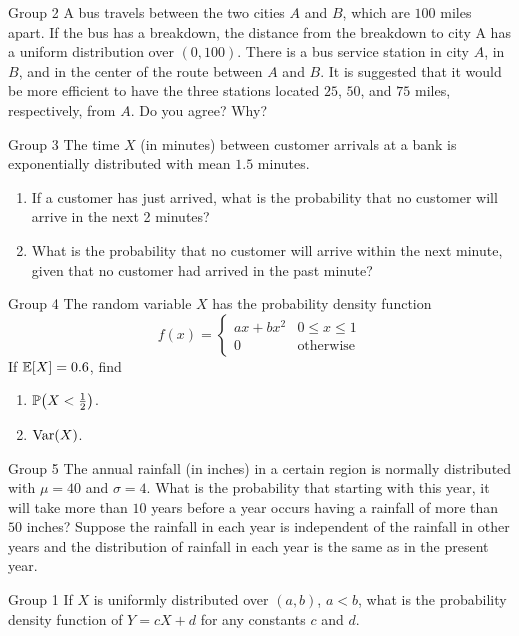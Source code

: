 \documentclass{article}
\begin{document}
\begin{problem}
    {Group 2}
    A bus travels between the two cities $A$ and $B$, which are $100$ miles apart. If the bus has a breakdown, the distance from the breakdown to city A has a uniform distribution over $(0, 100)$. There is a bus service station in city $A$, in $B$, and in the center of the route between $A$ and $B$. It is suggested that it would be more efficient to have the three stations located $25$, $50$, and $75$ miles, respectively, from $A$. Do you agree? Why?
\end{problem}

\begin{problem}
    {Group 3}
    The time $X$ (in minutes) between customer arrivals at a bank is exponentially distributed with mean $1.5$ minutes.
    \begin{enumerate}
        \item If a customer has just arrived, what is the probability         that no customer will arrive in the next 2 minutes?
        \item What is the probability that no customer will arrive within the next minute, given that no customer had arrived in the past minute?
    \end{enumerate}
\end{problem}

\begin{problem}
    {Group 4}
    The random variable $X$ has the probability density function
    \[f(x)={
        \begin{cases}
            ax+bx^2 & 0\leq x\leq 1\\
            0       & \text{otherwise}
        \end{cases}
    }\]
    If $\E{X}=0.6$, find
    \begin{enumerate}
        \item $\P{X<\frac{1}{2}}$.
        \item $\mathop{\mathrm{Var}}\nolimits(X)$.
    \end{enumerate}
\end{problem}

\begin{problem}
    {Group 5}
    The annual rainfall (in inches) in a certain region is normally distributed with $\mu = 40$ and $\sigma = 4$. What is the probability that starting with this year, it will take more than $10$ years before a year occurs having a rainfall of more than $50$ inches? Suppose the rainfall in each year is independent of the rainfall in other years and the distribution of rainfall in each year is the same as in the present year.
\end{problem}
\fi
\iffalse
\begin{problem}
    {Group 1}
    If $X$ is uniformly distributed over $(a, b)$, $a < b$, what is the probability density function of $Y = cX + d$ for any constants $c$ and $d$.
\end{problem}
\end{document}
